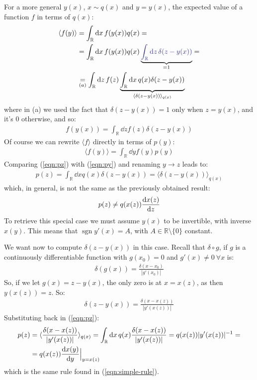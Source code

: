 \documentclass[../template.tex]{subfiles}
\begin{document}
For a more general $y(x)$, $x \sim q(x)$ and $y=y(x)$, the expected value of a function $f$ in terms of $q(x)$:
\begin{align}\nonumber
    \langle f(y) \rangle &= \int_{\mathbb{R}} \dd{x} f(y(x)) q(x) = \\
    \nonumber
    &= \int_{\mathbb{R}} \dd{x} f(y(x)) q(x) \underbrace{\textcolor{Blue}{\int_{\mathbb{R}} \dd{z} \delta(z-y(x))}}_{=1} = \\ 
    &\underset{(a)}{=}  \int_{\mathbb{R}} \dd{z} f(z) \underbrace{\int_{\mathbb{R}} \dd{x} q(x) \delta(z-y(x))}_{\langle \delta(z-y(x)) \rangle_{q(x)}}  
    \label{eqn:pz}
\end{align}    
where in (a) we used the fact that $\delta(z-y(x)) = 1$ only when $z=y(x)$, and it's $0$ otherwise, and so:
\begin{align*}
    f(y(x)) = \int_{\mathbb{R}} \dd{z} f(z) \delta(z-y(x))
\end{align*}   
Of course we can rewrite $\langle f \rangle$ directly in terms of $p(y)$:
\begin{align}
    \langle f(y) \rangle = \int_{\mathbb{R}} \dd{y} f(y) p(y)
    \label{eqn:py}
\end{align} 
Comparing (\ref{eqn:pz}) with (\ref{eqn:py}) and renaming $y \to z$ leads to: 
\begin{align}
    p(z) = \int_{\mathbb{R}} \dd{x} q(x) \delta(z- y(x)) = \langle \delta (z-y(x)) \rangle_{q(x)}
    \label{eqn:pz}
\end{align}
which, in general, is not the same as the previously obtained result:
\begin{align*}
    p(z) \neq q(x(z)) \dv{x(z)}{z}
\end{align*}
To retrieve this special case we must assume $y(x)$ to be invertible, with inverse $x(y)$. This means that $\operatorname{sgn} y'(x) = A$, with $A \in \mathbb{R}\setminus \{0\}$ constant.

We want now to compute $\delta(z-y(x))$ in this case. Recall that $\delta \circ g$, if $g$ is a continuously differentiable function with $g(x_0) = 0$ and $g'(x) \neq 0 \> \forall x$ is:
\begin{align*}
    \delta(g(x)) = \frac{\delta(x-x_0)}{|g'(x_0)|} 
\end{align*}      
So, if we let $g(x) = z-y(x)$, the only zero is at $x = x(z)$, as then $y(x(z)) = z$. So:
\begin{align*}
    \delta(z-y(x)) = \frac{\delta(x-x(z))}{|y'(x(z))|} 
\end{align*} 
Substituting back in (\ref{eqn:pz}):
\begin{align}\nonumber
    p(z) &= \langle \frac{\delta(x-x(z))}{|y'(x(z))|}  \rangle_{q(x)} = \int_{\mathbb{R}} \dd{x} q(x) \frac{\delta(x-x(z))}{|y'(x(z))|} = q(x(z)) |y'(x(z))|^{-1} =\\
    &=  q(x(z)) \dv{x(y)}{y} \Big|_{y= x(z)}  
\end{align}
which is the same rule found in (\ref{eqn:simple-rule}).
\end{document}
